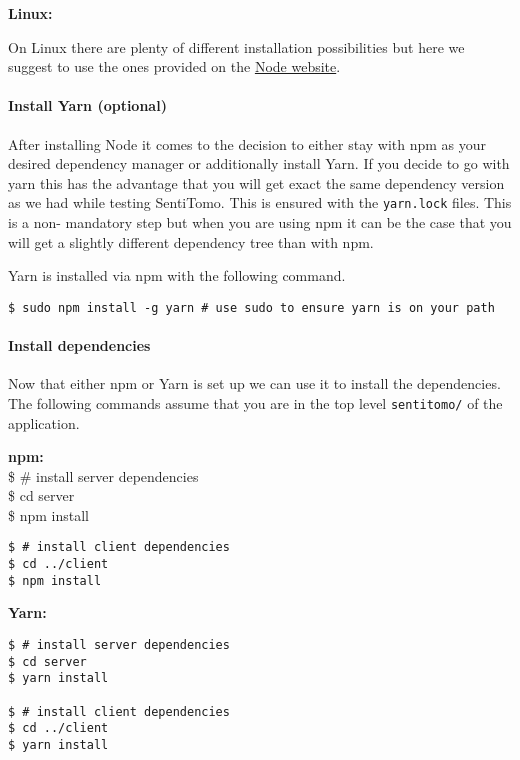 \documentclass[]{article}
\let\oldparagraph\paragraph
\renewcommand{\paragraph}[1]{\oldparagraph{#1}\mbox{}}
\begin{document}
\textbf{Linux:}

On Linux there are plenty of different installation possibilities but
here we suggest to use the ones provided on the
\href{https://nodejs.org/en/download/package-manager/}{Node website}.

\paragraph{Install Yarn (optional)}\label{install-yarn-optional}

After installing Node it comes to the decision to either stay with npm
as your desired dependency manager or additionally install Yarn. If you
decide to go with yarn this has the advantage that you will get exact
the same dependency version as we had while testing SentiTomo. This is
ensured with the \texttt{yarn.lock} files. This is a non- mandatory step
but when you are using npm it can be the case that you will get a
slightly different dependency tree than with npm.

Yarn is installed via npm with the following command.

\begin{verbatim}
$ sudo npm install -g yarn # use sudo to ensure yarn is on your path
\end{verbatim}

\paragraph{Install dependencies}\label{install-dependencies}

Now that either npm or Yarn is set up we can use it to install the
dependencies. The following commands assume that you are in the top
level \texttt{sentitomo/} of the application.

\textbf{npm:}\\
\$ \# install server dependencies\\
\$ cd server\\
\$ npm install

\begin{verbatim}
$ # install client dependencies
$ cd ../client
$ npm install
\end{verbatim}

\textbf{Yarn:}

\begin{verbatim}
$ # install server dependencies
$ cd server
$ yarn install

$ # install client dependencies
$ cd ../client
$ yarn install
\end{verbatim}
\end{document}
